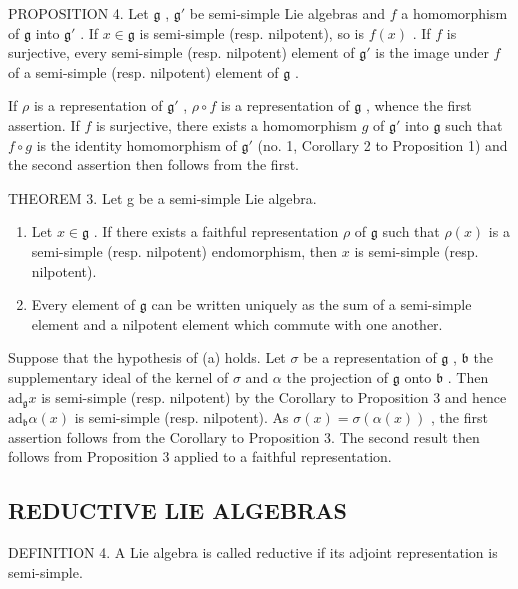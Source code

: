 PROPOSITION 4. Let \(\mathfrak{g}\) , \(\mathfrak{g}'\) be semi-simple Lie algebras and \(f\) a homomorphism of \(\mathfrak{g}\) into \(\mathfrak{g}'\) . If \(x \in \mathfrak{g}\) is semi-simple (resp. nilpotent), so is \(f(x)\) . If \(f\) is surjective, every semi-simple (resp. nilpotent) element of \(\mathfrak{g}'\) is the image under \(f\) of a semi-simple (resp. nilpotent) element of \(\mathfrak{g}\) .

If \(\rho\) is a representation of \(\mathfrak{g}'\) , \(\rho \circ f\) is a representation of \(\mathfrak{g}\) , whence the first assertion. If \(f\) is surjective, there exists a homomorphism \(g\) of \(\mathfrak{g}'\) into \(\mathfrak{g}\) such that \(f \circ g\) is the identity homomorphism of \(\mathfrak{g}'\) (no. 1, Corollary 2 to Proposition 1) and the second assertion then follows from the first.

THEOREM 3. Let g be a semi-simple Lie algebra.

\begin{enumerate}
\def\labelenumi{(\alph{enumi})}
\item
  Let \(x \in \mathfrak{g}\) . If there exists a faithful representation \(\rho\) of \(\mathfrak{g}\) such that \(\rho(x)\) is a semi-simple (resp. nilpotent) endomorphism, then \(x\) is semi-simple (resp. nilpotent).
\item
  Every element of \(\mathfrak{g}\) can be written uniquely as the sum of a semi-simple element and a nilpotent element which commute with one another.
\end{enumerate}

Suppose that the hypothesis of (a) holds. Let \(\sigma\) be a representation of \(\mathfrak{g}\) , \(\mathfrak{b}\) the supplementary ideal of the kernel of \(\sigma\) and \(\alpha\) the projection of \(\mathfrak{g}\) onto \(\mathfrak{b}\) . Then \(\mathrm{ad}_{\mathfrak{g}}x\) is semi-simple (resp. nilpotent) by the Corollary to Proposition 3 and hence \(\mathrm{ad}_{\mathfrak{b}}\alpha(x)\) is semi-simple (resp. nilpotent). As \(\sigma(x)=\sigma(\alpha(x))\) , the first assertion follows from the Corollary to Proposition 3. The second result then follows from Proposition 3 applied to a faithful representation.

\subsection{REDUCTIVE LIE ALGEBRAS}

DEFINITION 4. A Lie algebra is called reductive if its adjoint representation is semi-simple.

